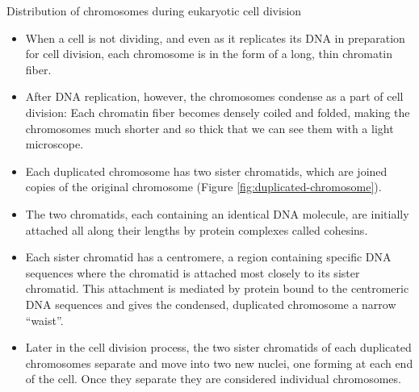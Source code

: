 \documentclass[11pt,ignorenonframetext,aspectratio=169]{beamer}
\providecommand{\tightlist}{%
  \setlength{\itemsep}{0pt}\setlength{\parskip}{0pt}}
\begin{document}
\begin{frame}{Distribution of chromosomes during eukaryotic cell
division}
\protect\hypertarget{distribution-of-chromosomes-during-eukaryotic-cell-division}{}
\begin{itemize}
\tightlist
\item
  When a cell is not dividing, and even as it replicates its DNA in
  preparation for cell division, each chromosome is in the form of a
  long, thin chromatin fiber.
\item
  After DNA replication, however, the chromosomes condense as a part of
  cell division: Each chromatin fiber becomes densely coiled and folded,
  making the chromosomes much shorter and so thick that we can see them
  with a light microscope.
\item
  Each duplicated chromosome has two sister chromatids, which are joined
  copies of the original chromosome (Figure
  \ref{fig:duplicated-chromosome}).
\item
  The two chromatids, each containing an identical DNA molecule, are
  initially attached all along their lengths by protein complexes called
  cohesins.
\end{itemize}
\end{frame}

\begin{frame}{}
\protect\hypertarget{section-8}{}
\begin{itemize}
\tightlist
\item
  Each sister chromatid has a centromere, a region containing specific
  DNA sequences where the chromatid is attached most closely to its
  sister chromatid. This attachment is mediated by protein bound to the
  centromeric DNA sequences and gives the condensed, duplicated
  chromosome a narrow ``waist''.
\item
  Later in the cell division process, the two sister chromatids of each
  duplicated chromosomes separate and move into two new nuclei, one
  forming at each end of the cell. Once they separate they are
  considered individual chromosomes.
\end{itemize}
\end{frame}
\end{document}
